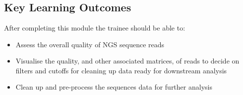 
\chapter{\moduleTitle}
\newpage


% 
\section{Key Learning Outcomes}

After completing this module the trainee should be able to:
\begin{itemize}
  \item Assess the overall quality of NGS sequence reads
  \item Visualise the quality, and other associated matrices, of reads to decide
        on filters and cutoffs for cleaning up data ready for downstream analysis
  \item Clean up and pre-process the sequences data for further analysis
\end{itemize}

